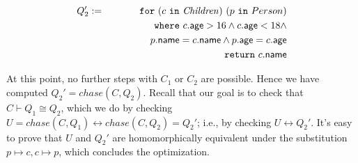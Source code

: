 \documentclass[preprint]{sigplanconf}
\newcommand{\FOR}{{\tt for}\relax\ifmmode\ \else\xspace\fi}
\newcommand{\WHERE}{{\tt where}\relax\ifmmode\ \else\xspace\fi}
\newcommand{\IN}{ \ {\tt in} \ }
\newcommand{\RETURN}{{\tt return}\relax\ifmmode\ \else\xspace\fi}
\newcommand{\relation}[1]{\ensuremath{\mathit{#1}}\xspace}
\begin{document}
\begin{eqnarray*}
Q_2' & := & \FOR (c \IN \relation{Children}) \ (p \IN Person) \\
 & & \WHERE c.{\sf age} > 16 \wedge c.{\sf age} < 18 \wedge \\
 & & \ \ \ \ \ \ \ \ \ \ \ \   p.{\sf name} = c.{\sf name} \wedge p.{\sf age} = c.{\sf age}\\
  & & \RETURN c.{\sf name}
\end{eqnarray*}  

At this point, no further steps with $C_1$ or $C_2$ are possible.
Hence we have computed $Q_2' = chase(C, Q_2)$.
Recall that our goal is to check that $C \vdash Q_1 \cong Q_2$, which we do by checking $U = chase(C, Q_1) \leftrightarrow chase(C, Q_2) = Q_2'$; i.e., by checking $U \leftrightarrow Q_2'$.
It's easy to prove that $U$ and $Q_2'$ are homomorphically equivalent under the substitution $p \mapsto c, c \mapsto p$, which concludes the optimization.

%
%
\end{document}

